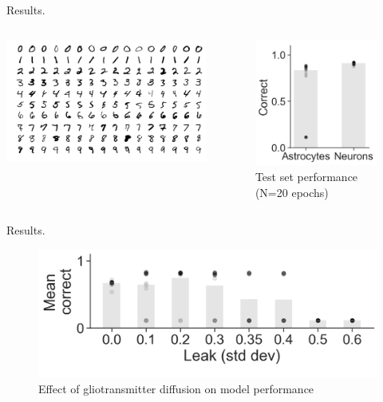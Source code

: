 \documentclass[10pt]{beamer}
\begin{document}
\begin{frame}[fragile]{Results.}
\begin{columns}
    \centering
    \includegraphics[scale=0.2]{images/minst.png} 
\begin{figure}
    \centering
    \includegraphics[scale=0.3]{images/results.png} 
    \caption{Test set performance (N=20 epochs)}
\end{figure}
\end{columns}
\end{frame}

\begin{frame}[fragile]{Results.}
\begin{figure}
    \centering
    \includegraphics[scale=0.25]{images/leak.png} 
    \caption{Effect of gliotransmitter diffusion on model performance}
\end{figure}
\end{frame}
\end{document}

